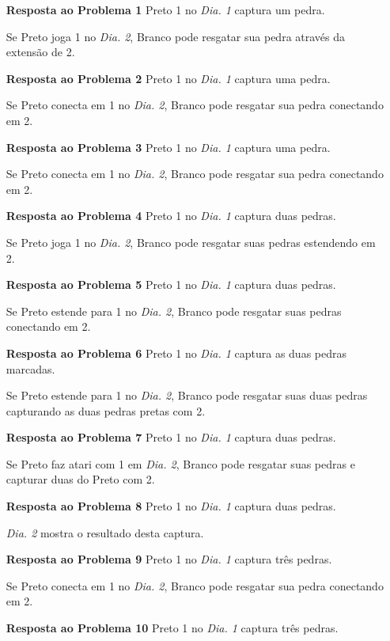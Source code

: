 \begin{itemize}
  \item[\textbf{Resposta ao Problema 1}]
      Preto 1 no \emph{Dia. 1} captura um pedra.

      Se Preto joga 1 no \emph{Dia. 2}, Branco pode resgatar sua pedra através da extensão de 2.
  \item[\textbf{Resposta ao Problema 2}]
      Preto 1 no \emph{Dia. 1} captura uma pedra.

      Se Preto conecta em 1 no \emph{Dia. 2}, Branco pode resgatar sua pedra conectando em 2.
  \item[\textbf{Resposta ao Problema 3}]
      Preto 1 no \emph{Dia. 1} captura uma pedra.

      Se Preto conecta em 1 no \emph{Dia. 2}, Branco pode resgatar sua pedra conectando em 2.
  \item[\textbf{Resposta ao Problema 4}]
      Preto 1 no \emph{Dia. 1} captura duas pedras.

      Se Preto joga 1 no \emph{Dia. 2}, Branco pode resgatar suas pedras estendendo em 2.
  \item[\textbf{Resposta ao Problema 5}]
      Preto 1 no \emph{Dia. 1} captura duas pedras.

      Se Preto estende para 1 no \emph{Dia. 2}, Branco pode resgatar suas pedras conectando em 2.
  \item[\textbf{Resposta ao Problema 6}]
      Preto 1 no \emph{Dia. 1} captura as duas pedras marcadas.

      Se Preto estende para 1 no \emph{Dia. 2}, Branco pode resgatar suas duas pedras capturando as duas pedras pretas com 2.
  \item[\textbf{Resposta ao Problema 7}]
      Preto 1 no \emph{Dia. 1} captura duas pedras.

      Se Preto faz atari com 1 em \emph{Dia. 2}, Branco pode resgatar suas pedras e capturar duas do Preto com 2.
  \item[\textbf{Resposta ao Problema 8}]
      Preto 1 no \emph{Dia. 1} captura duas pedras.

      \emph{Dia. 2} mostra o resultado desta captura.
  \item[\textbf{Resposta ao Problema 9}]
      Preto 1 no \emph{Dia. 1} captura três pedras.

      Se Preto conecta em 1 no \emph{Dia. 2}, Branco pode resgatar sua pedra conectando em 2.
  \item[\textbf{Resposta ao Problema 10}]
      Preto 1 no \emph{Dia. 1} captura três pedras.


\end{itemize}
